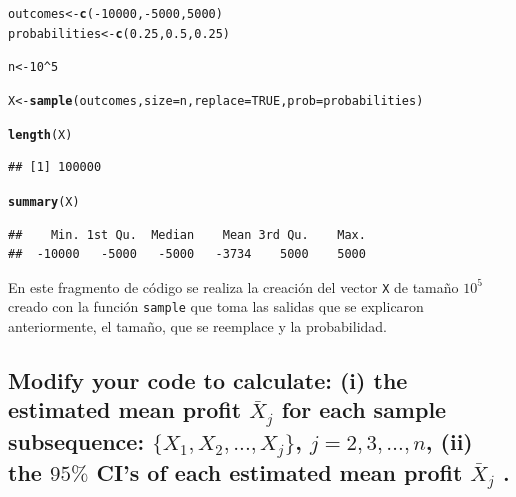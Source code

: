 \documentclass[12pt]{article}\usepackage[]{graphicx}\usepackage[]{xcolor}
\makeatletter
\newcommand{\hlnum}[1]{\textcolor[rgb]{0.686,0.059,0.569}{#1}}%
\newcommand{\hlopt}[1]{\textcolor[rgb]{0,0,0}{#1}}%
\newcommand{\hldef}[1]{\textcolor[rgb]{0.345,0.345,0.345}{#1}}%
\newcommand{\hlkwb}[1]{\textcolor[rgb]{0.69,0.353,0.396}{#1}}%
\newcommand{\hlkwc}[1]{\textcolor[rgb]{0.333,0.667,0.333}{#1}}%
\newcommand{\hlkwd}[1]{\textcolor[rgb]{0.737,0.353,0.396}{\textbf{#1}}}%
\newenvironment{kframe}{%
 \def\at@end@of@kframe{}%
 \ifinner\ifhmode%
  \def\at@end@of@kframe{\end{minipage}}%
  \begin{minipage}{\columnwidth}%
 \fi\fi%
 \def\FrameCommand##1{\hskip\@totalleftmargin \hskip-\fboxsep
 \colorbox{shadecolor}{##1}\hskip-\fboxsep
     \hskip-\linewidth \hskip-\@totalleftmargin \hskip\columnwidth}%
 \MakeFramed {\advance\hsize-\width
   \@totalleftmargin\z@ \linewidth\hsize
   \@setminipage}}%
 {\par\unskip\endMakeFramed%
 \at@end@of@kframe}
\newenvironment{knitrout}{}{} %
\makeatother
\begin{document}
\begin{knitrout}
\color{fgcolor}\begin{kframe}
\begin{alltt}
\hldef{outcomes} \hlkwb{<-} \hlkwd{c}\hldef{(}\hlopt{-}\hlnum{10000}\hldef{,} \hlopt{-}\hlnum{5000}\hldef{,} \hlnum{5000}\hldef{)}
\hldef{probabilities} \hlkwb{<-} \hlkwd{c}\hldef{(}\hlnum{0.25}\hldef{,} \hlnum{0.5}\hldef{,} \hlnum{0.25}\hldef{)}

\hldef{n} \hlkwb{<-} \hlnum{10}\hlopt{^}\hlnum{5}

\hldef{X} \hlkwb{<-} \hlkwd{sample}\hldef{(outcomes,} \hlkwc{size} \hldef{= n ,} \hlkwc{replace} \hldef{=} \hlnum{TRUE}\hldef{,} \hlkwc{prob} \hldef{= probabilities)}

\hlkwd{length}\hldef{(X)}
\end{alltt}
\begin{verbatim}
## [1] 100000
\end{verbatim}
\begin{alltt}
\hlkwd{summary}\hldef{(X)}
\end{alltt}
\begin{verbatim}
##    Min. 1st Qu.  Median    Mean 3rd Qu.    Max. 
##  -10000   -5000   -5000   -3734    5000    5000
\end{verbatim}
\end{kframe}
\end{knitrout}

En este fragmento de código se realiza la creación del vector \lstinline|X| de tamaño $10^{5}$ creado con la función \lstinline|sample| que toma las salidas que se explicaron anteriormente, el tamaño, que se reemplace y la probabilidad.


\subsection{Modify your code to calculate: (i) the estimated mean profit $\bar{X}_{j}$ for each sample subsequence: $\{X_{1}, X_{2}, . . . , X_{j} \}$, $j = 2, 3, \dots, n$, (ii) the $95 \%$ CI’s of each estimated mean profit $\bar{X}_{j}$ .}
\end{document}
